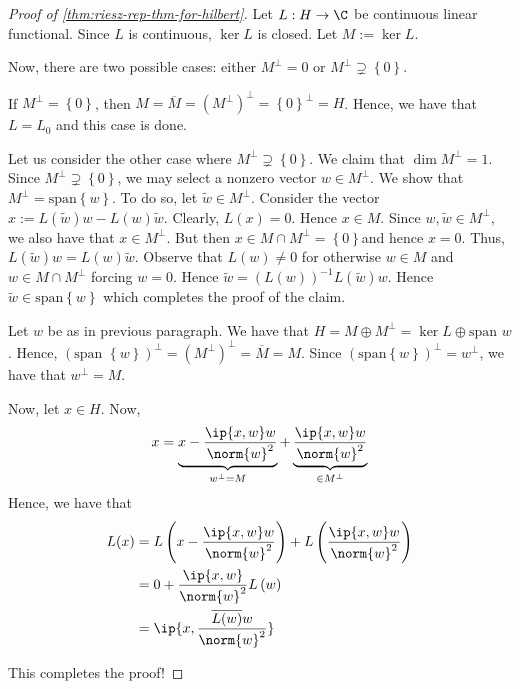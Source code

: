 \begin{proof}[Proof of \ref{thm:riesz-rep-thm-for-hilbert}]
    Let $L : H \to \C$ be continuous linear functional. Since $L$ is continuous, $\ker L$ is closed. Let $M:= \ker L$.

    Now, there are two possible cases: either $M^{\perp} = 0$ or $M^{\perp} \supsetneq \left\{ 0 \right\}$.

    If $M^{\perp} = \left\{0\right\}$, then $M= \overline {M} = (M^{\perp})^{\perp} = \left\{0\right\} ^{\perp} = H$. Hence, we have that $L = L_{0}$ and this case is done.

    Let us consider the other case where $M^{\perp} \supsetneq \left\{0\right\}$. We claim that $\dim M^{\perp} = 1$. Since $M^{\perp} \supsetneq\left\{0\right\}$, we may select a nonzero vector $w \in M^{\perp}$. We show that $M^{\perp} = \text{span} \left\{w\right\}$. To do so, let $\tilde {w} \in M^{\perp}$. Consider the vector $x:= L\left(\tilde{w}\right) w - L(w)\tilde{w}$. Clearly, $L(x) = 0$. Hence $x \in M$. Since $w, \tilde{w} \in M^{\perp}$, we also have that $x \in M^{\perp}$. But then $x \in M \cap M^{\perp} = \left\{ 0 \right\}$and hence $x=0$. Thus, $L \left(\tilde w\right)w = L(w)\tilde w$. Observe that $L(w)\ne0$ for otherwise $w\in M$ and $w\in M\cap M^{\perp}$ forcing $w=0$. Hence $\tilde w= \left(L\left(w\right)\right)^{-1} L (\tilde w)w$. Hence $\tilde w \in \text{span} \left\{w\right\}$ which completes the proof of the claim.

    Let $w$ be as in previous paragraph. We have that $H = M \oplus M^{\perp} = \ker L \oplus \text{span } w$. Hence, $\left(\text{span }\left\{w\right\}\right)^{\perp} = (M^{\perp})^{\perp} = \overline {M} = M$. Since $\left(\text{span}\left\{w\right\}\right)^{\perp} = w^{\perp}$, we have that $w^{\perp} = M$.

    Now, let $x\in H$. Now,
    \begin{equation*}
	x=\underbrace{x-\frac{\ip{x,w}w}{\norm{w}^{2}}}_{w^{\perp}=M} + \underbrace{\frac{\ip{x,w}w}{\norm{w}^{2}}}_{\in M^{\perp}}
    \end{equation*}
    Hence, we have that
    \begin{align*}
      L(x)  &= L \left( x-\frac{\ip{x,w}w}{\norm{w}^{2}} \right) + L \left( \frac{\ip{x,w}w}{\norm{w}^{2}} \right) \\
            &= 0 + \frac{\ip{x,w}}{\norm{w}^2}L\left(w\right) \\
            &=\ip{x, \frac{\overline {L(w)}w}{\norm {w} ^{2}}}
    \end{align*}

    This completes the proof!
   \end{proof}
